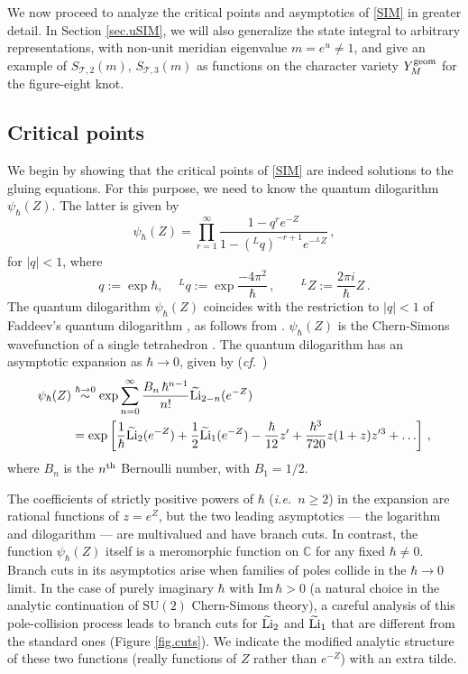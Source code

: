 \documentclass[12pt]{amsart}
\newcommand{\lbl}{\label}
\theoremstyle{definition}
\def\be{  \begin{equation} }
\def\ee{  \end{equation} }
\def\hb{\hbar}
\newcommand{\CT}{\mathcal{T}}
\newcommand{\C}{\mathbb{C}}
\newcommand{\Li}{{\rm Li}}
\newcommand{\wt}{\widetilde}
\newcommand{\ie}{\emph{i.e.}}
\newcommand{\cf}{\emph{cf.}}
\numberwithin{equation}{section}
\begin{document}
We now proceed to analyze the critical points and asymptotics of \eqref{SIM} in greater detail. In Section \ref{sec.uSIM}, we will also generalize the state integral to arbitrary representations, with non-unit meridian eigenvalue $m=e^u\neq 1$, and give an example of $S_{\CT,2}(m)$, $S_{\CT,3}(m)$ as functions on the character variety $Y_M^{\rm geom}$ for the figure-eight knot.




\subsection{Critical points}
\lbl{sec.saddle}

We begin by showing that the critical points of \eqref{SIM} are indeed 
solutions to the gluing equations. For this purpose, we need to know 
the quantum dilogarithm $\psi_{\hb}(Z)$. The latter is given by 
\cite[Eqn.3.22]{DGLZ}
%
\be \label{qdl} \psi_{\hb}(Z) = \prod_{r=1}^\infty \frac{1-q^r e^{-Z}} {1-({}^Lq)^{-r+1}e^{-{}^LZ}}\,,
\ee
%
for $|q|<1$, where
%
\be q := \exp \hbar,\,\quad {}^L q := \exp \frac{-4\pi^2}{\hbar}\,,
\qquad {}^LZ := \frac{2\pi i}{\hbar}Z\,.\ee
%
The quantum dilogarithm $\psi_{\hb}(Z)$ coincides with the restriction to
$|q|<1$ of Faddeev's quantum dilogarithm \cite{Fa}, as follows from
\cite[Eqn.3.23]{DGLZ}. $\psi_{\hb}(Z)$ is the Chern-Simons wavefunction 
of a single tetrahedron \cite{D1}.  
The quantum dilogarithm has an asymptotic expansion as $\hbar\to 0$, given by (\cf\ \cite[Eqn.3.26]{DGLZ})
%
\begin{align} \label{qdlasymp}
\psi_{\hb}(Z) &\overset{\hbar\to 0}{\sim} 
\exp \sum_{n=0}^\infty \frac{B_n\,\hbar^{n-1}}{n!} \wt \Li_{2-n}(e^{-Z}) \\
&= \exp\left[\frac{1}{\hbar}\wt\Li_2(e^{-Z})+\frac12\wt\Li_1(e^{-Z})
-\frac\hbar{12}z'+\frac{\hbar^3}{720}z(1+z)z'^3+\ldots\right]\,,  \notag
\end{align}
%
where $B_n$ is the $n^{\rm th}$ Bernoulli number, with $B_1=1/2$.

The coefficients of strictly positive powers of 
$\hbar$ (\ie\ $n\geq 2$) in the expansion are rational functions of 
$z=e^{Z}$, but the two leading asymptotics --- the logarithm and dilogarithm --- are multivalued and have branch cuts. 
In contrast, the function $\psi_{\hb}(Z)$ itself is a meromorphic function on $\C$ for 
any fixed $\hbar\neq 0$. Branch cuts in its asymptotics arise when 
families of poles collide in the $\hbar\to 0$ limit. In the case of purely imaginary $\hbar$ 
with $\mathrm{Im}\,\hbar>0$ (a natural choice in the analytic continuation 
of $\mathrm{SU}(2)$ Chern-Simons theory), a careful analysis of this 
pole-collision 
process leads to branch cuts for $\wt \Li_2$ and $\wt \Li_1$ that are 
different from the standard ones (Figure \ref{fig.cuts}). We indicate 
the modified analytic structure of these two functions (really functions 
of $Z$ rather than $e^{-Z}$) with an extra tilde.
\end{document}

